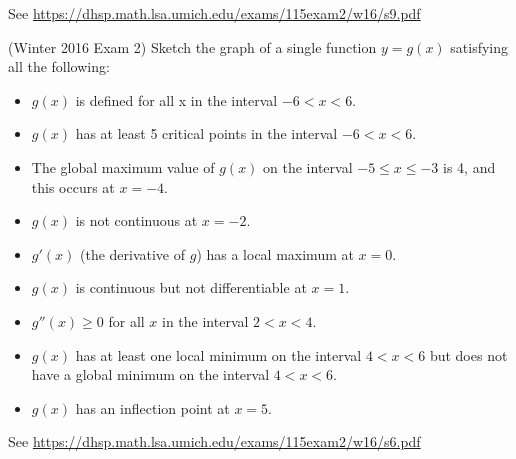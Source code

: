 \documentclass[11pt]{exam}
\begin{document}
\begin{questions}
  \begin{solution}
    See \href{https://dhsp.math.lsa.umich.edu/exams/115exam2/w16/s9.pdf}{https://dhsp.math.lsa.umich.edu/exams/115exam2/w16/s9.pdf}
  \end{solution}
  \pagebreak
\question (Winter 2016 Exam 2) %
Sketch the graph of a single function $y = g(x)$ satisfying all the following:
\begin{itemize}
\item $g(x)$ is defined for all x in the interval $-6 < x < 6$.
\item $g(x)$ has at least 5 critical points in the interval $-6 < x < 6$.
\item The global maximum value of $g(x)$ on the interval $-5 \leqslant x \leqslant -3$ is 4, and this occurs at $x = -4$.
\item $g(x)$ is not continuous at $x = -2$.
\item $g'(x)$ (the derivative of $g$) has a local maximum at $x = 0$.
\item $g(x)$ is continuous but not differentiable at $x = 1$.
\item $g''(x) \geqslant 0$ for all $x$ in the interval $2 < x < 4$.
\item $g(x)$ has at least one local minimum on the interval $4 < x < 6$ but does not have a global minimum on the interval $4 < x < 6$.
\item $g(x)$ has an inflection point at $x = 5$.
\end{itemize}
\begin{solution}
  See \href{https://dhsp.math.lsa.umich.edu/exams/115exam2/w16/s6.pdf}{https://dhsp.math.lsa.umich.edu/exams/115exam2/w16/s6.pdf}
\end{solution}
\end{questions}
\end{document}
